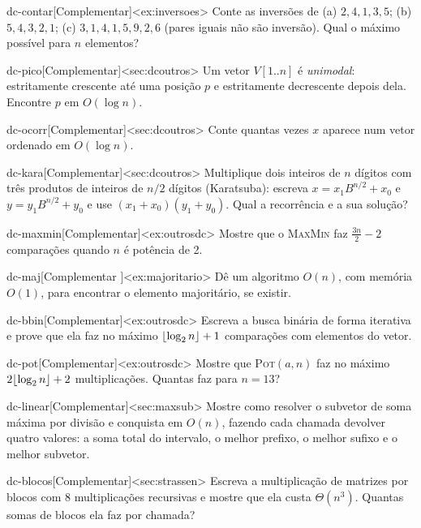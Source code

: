 \excompl
\begin{exercicio}{dc-contar}[Complementar]<ex:inversoes>
Conte as inversões de (a) $2,4,1,3,5$; (b) $5,4,3,2,1$; (c) $3,1,4,1,5,9,2,6$ (pares iguais não são inversão). Qual o máximo possível para $n$ elementos?
\end{exercicio}
\begin{exercicio}{dc-pico}[Complementar]<sec:dcoutros>
Um vetor $V[1..n]$ é \emph{unimodal}: estritamente crescente até uma posição $p$ e estritamente decrescente depois dela. Encontre $p$ em $O(\log n)$.
\end{exercicio}
\begin{exercicio}{dc-ocorr}[Complementar]<sec:dcoutros>
Conte quantas vezes $x$ aparece num vetor ordenado em $O(\log n)$.
\end{exercicio}
\begin{exercicio}{dc-kara}[Complementar]<sec:dcoutros>
Multiplique dois inteiros de $n$ dígitos com três produtos de inteiros de $n/2$ dígitos (Karatsuba): escreva $x=x_1B^{n/2}+x_0$ e $y=y_1B^{n/2}+y_0$ e use $(x_1+x_0)(y_1+y_0)$. Qual a recorrência e a sua solução?
\end{exercicio}
\begin{exercicio}{dc-maxmin}[Complementar]<ex:outrosdc>
Mostre que o \textsc{MaxMin} faz $\frac{3n}2-2$ comparações quando $n$ é potência de 2.
\end{exercicio}
\begin{exercicio}{dc-maj}[Complementar \estrela]<ex:majoritario>
Dê um algoritmo $O(n)$, com memória $O(1)$, para encontrar o elemento majoritário, se existir.
\end{exercicio}
\begin{exercicio}{dc-bbin}[Complementar]<ex:outrosdc>
Escreva a busca binária de forma iterativa e prove que ela faz no máximo $\lfloor\log_2n\rfloor+1$ comparações com elementos do vetor.
\end{exercicio}
\begin{exercicio}{dc-pot}[Complementar]<ex:outrosdc>
Mostre que \textsc{Pot}$(a,n)$ faz no máximo $2\lfloor\log_2n\rfloor+2$ multiplicações. Quantas faz para $n=13$?
\end{exercicio}
\begin{exercicio}{dc-linear}[Complementar]<sec:maxsub>
Mostre como resolver o subvetor de soma máxima por divisão e conquista em $O(n)$, fazendo cada chamada devolver quatro valores: a soma total do intervalo, o melhor prefixo, o melhor sufixo e o melhor subvetor.
\end{exercicio}
\begin{exercicio}{dc-blocos}[Complementar]<sec:strassen>
Escreva a multiplicação de matrizes por blocos com 8 multiplicações recursivas e mostre que ela custa $\Theta(n^3)$. Quantas somas de blocos ela faz por chamada?
\end{exercicio}
